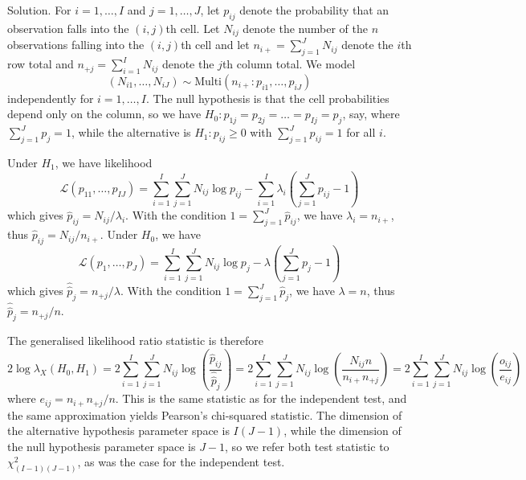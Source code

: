 Solution. For $i=1,\dots,I$ and $j=1,\dots,J$, let $p_{ij}$ denote the probability that an observation falls into the $(i,j)$th cell. Let $N_{ij}$ denote the number of the $n$ observations falling into the $(i,j)$th cell and let $n_{i+}=\sum^J_{j=1}N_{ij}$ denote the $i$th row total and $n_{+j}=\sum^I_{i=1}N_{ij}$ denote the $j$th column total. We model
\begin{equation}
(N_{i1},\dots,N_{iJ})\sim\text{Multi}(n_{i+}:p_{i1},\dots,p_{iJ})
\end{equation}
independently for $i=1,\dots,I$. The null hypothesis is that the cell probabilities depend only on the column, so we have $H_0: p_{1j}=p_{2j}=\dots=p_{Ij}=p_j$, say, where $\sum^J_{j=1}p_j=1$, while the alternative is $H_1: p_{ij}\geq 0$ with $\sum^J_{j=1}p_{ij}=1$ for all $i$.

Under $H_1$, we have likelihood
\begin{equation}
\mathcal{L}(p_{11},\dots,p_{IJ}) = \sum^I_{i=1}\sum^J_{j=1}N_{ij}\log p_{ij}-\sum^I_{i=1}\lambda_i\left(\sum^J_{j=1}p_{ij}-1\right)
\end{equation}
which gives $\hat{p}_{ij}=N_{ij}/\lambda_i$. With the condition $1=\sum^J_{j=1}\hat{p}_{ij}$, we have $\lambda_i=n_{i+}$, thus $\hat{p}_{ij}=N_{ij}/n_{i+}$. Under $H_0$, we have
\begin{equation}
\mathcal{L}(p_{1},\dots,p_{J}) = \sum^I_{i=1}\sum^J_{j=1}N_{ij}\log p_{j}-\lambda\left(\sum^J_{j=1}p_{j}-1\right)
\end{equation}
which gives $\hat{\hat{p}}_{j}=n_{+j}/\lambda$. With the condition $1=\sum^J_{j=1}\hat{p}_{j}$, we have $\lambda=n$, thus $\hat{\hat{p}}_{j}=n_{+j}/n$.

The generalised likelihood ratio statistic is therefore
\begin{equation}
2\log\lambda_X(H_0,H_1) = 2\sum^I_{i=1}\sum^J_{j=1}N_{ij}\log\left(\frac{\hat{p}_{ij}}{\hat{\hat{p}}_{j}}\right) = 2\sum^I_{i=1}\sum^J_{j=1}N_{ij}\log\left(\frac{N_{ij}n}{n_{i+}n_{+j}}\right) = 2\sum^I_{i=1}\sum^J_{j=1}N_{ij}\log\left(\frac{o_{ij}}{e_{ij}}\right)
\end{equation}
where $e_{ij}=n_{i+}n_{+j}/n$. This is the same statistic as for the independent test, and the same approximation yields Pearson's chi-squared statistic. The dimension of the alternative hypothesis parameter space is $I(J-1)$, while the dimension of the null hypothesis parameter space is $J-1$, so we refer both test statistic to $\chi^2_{(I-1)(J-1)}$, as was the case for the independent test.

